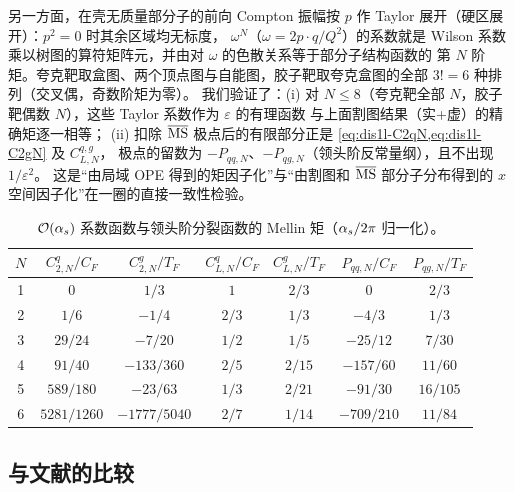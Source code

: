 另一方面，在壳无质量部分子的前向 Compton 振幅按 $p$ 作 Taylor 展开（硬区展开）：$p^2=0$ 时其余区域均无标度，
$\omega^N$（$\omega=2p\cdot q/Q^2$）的系数就是 Wilson 系数乘以树图的算符矩阵元，并由对 $\omega$ 的色散关系等于部分子结构函数的
第 $N$ 阶矩。夸克靶取盒图、两个顶点图与自能图，胶子靶取夸克盒图的全部 $3!=6$ 种排列（交叉偶，奇数阶矩为零）。
我们验证了：(i) 对 $N\le8$（夸克靶全部 $N$，胶子靶偶数 $N$），这些 Taylor 系数作为 $\varepsilon$ 的有理函数
与上面割图结果（实+虚）的精确矩逐一相等；
(ii) 扣除 $\overline{\mathrm{MS}}$ 极点后的有限部分正是 \cref{eq:dis1l-C2qN,eq:dis1l-C2gN} 及 $C^{q,g}_{L,N}$，
极点的留数为 $-P_{qq,N}$、$-P_{qg,N}$（领头阶反常量纲），且不出现 $1/\varepsilon^2$。
这是“由局域 OPE 得到的矩因子化”与“由割图和 $\overline{\mathrm{MS}}$ 部分子分布得到的 $x$ 空间因子化”在一圈的直接一致性检验。

\begin{table}[htbp]
\centering
\caption{$\mathcal{O}\!\left(\alpha_s\right)$ 系数函数与领头阶分裂函数的 Mellin 矩（$\alpha_s/2\pi$ 归一化）。}
\label{tab:dis1l-moments}
\begin{tabular}{ccccccc}
\toprule
$N$ & $C^q_{2,N}/C_F$ & $C^g_{2,N}/T_F$ & $C^q_{L,N}/C_F$ & $C^g_{L,N}/T_F$ & $P_{qq,N}/C_F$ & $P_{qg,N}/T_F$\\
\midrule
1 & $0$ & $1/3$ & $1$ & $2/3$ & $0$ & $2/3$\\
2 & $1/6$ & $-1/4$ & $2/3$ & $1/3$ & $-4/3$ & $1/3$\\
3 & $29/24$ & $-7/20$ & $1/2$ & $1/5$ & $-25/12$ & $7/30$\\
4 & $91/40$ & $-133/360$ & $2/5$ & $2/15$ & $-157/60$ & $11/60$\\
5 & $589/180$ & $-23/63$ & $1/3$ & $2/21$ & $-91/30$ & $16/105$\\
6 & $5281/1260$ & $-1777/5040$ & $2/7$ & $1/14$ & $-709/210$ & $11/84$\\
\bottomrule
\end{tabular}
\end{table}

\subsection{与文献的比较}

